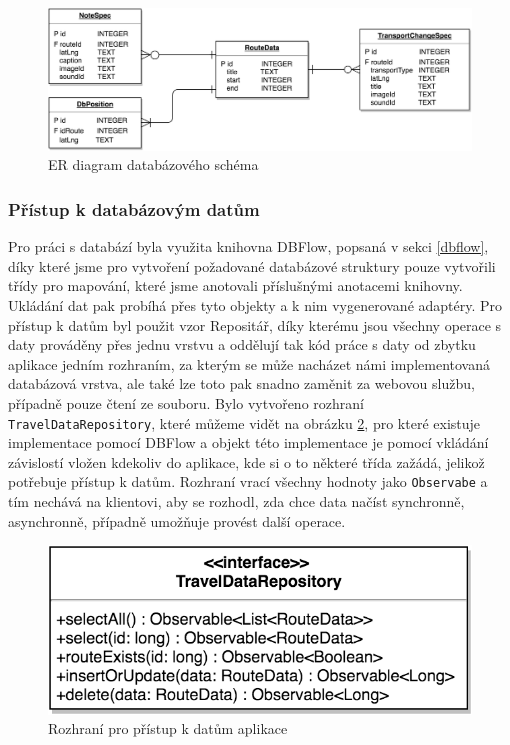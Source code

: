 \documentclass[czech,master,public,dept460,male,java,cpdeclaration]{diploma}
\begin{document}
\begin{figure}[H]
        \centering
                \includegraphics[scale=0.2]{img/db_er.png}
        \caption{ER diagram databázového schéma}
        \label{fig:db_er}
\end{figure}

\subsubsection{Přístup k databázovým datům}
Pro práci s databází byla využita knihovna DBFlow, popsaná v sekci \ref{dbflow}, díky které jsme pro vytvoření
požadované databázové struktury pouze vytvořili třídy pro mapování, které jsme anotovali příslušnými
anotacemi knihovny. Ukládání dat pak probíhá přes tyto objekty a k nim vygenerované adaptéry.
Pro přístup k datům byl použit vzor Repositář\cite{repository}, díky kterému
jsou všechny operace s daty prováděny přes jednu vrstvu a oddělují tak kód práce s daty od zbytku aplikace
jedním rozhraním, za kterým se může nacházet námi implementovaná databázová vrstva, ale také lze toto
pak snadno zaměnit za webovou službu, případně pouze čtení ze souboru.
Bylo vytvořeno rozhraní \texttt{TravelDataRepository}, které můžeme vidět na obrázku \ref{fig:traveldatarepo},
pro které existuje implementace pomocí DBFlow a objekt této implementace je pomocí vkládání závislostí vložen
kdekoliv do aplikace, kde si o to některé třída zažádá, jelikož potřebuje přístup k datům.
Rozhraní vrací všechny hodnoty jako \texttt{Observabe} a tím nechává na klientovi, aby se rozhodl, zda
chce data načíst synchronně, asynchronně, případně umožňuje provést další operace.

\begin{figure}[H]
        \centering
                \includegraphics[scale=0.2]{img/repo.png}
        \caption{Rozhraní pro přístup k datům aplikace}
        \label{fig:traveldatarepo}
\end{figure}
\end{document}
